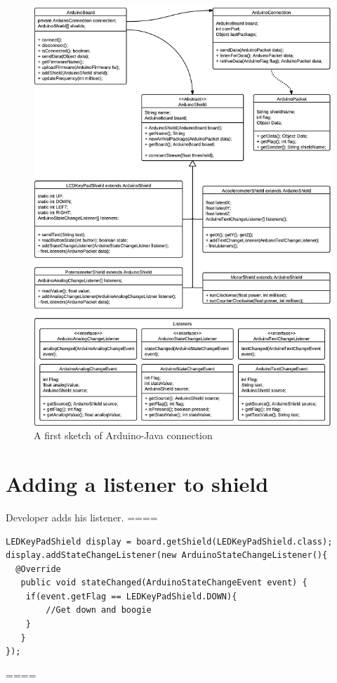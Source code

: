\clearpage

\begin{figure}[hp]
  \includegraphics{./img/architecture-arduinojava.png}
  \caption{A first sketch of Arduino-Java connection}
  \label{fig:architecture-arduinojava}
\end{figure}

\section{Adding a listener to shield}


Developer adds his listener.
====
\javacode
\begin{lstlisting}
LEDKeyPadShield display = board.getShield(LEDKeyPadShield.class);
display.addStateChangeListener(new ArduinoStateChangeListener(){
  @Override
   public void stateChanged(ArduinoStateChangeEvent event) {
    if(event.getFlag == LEDKeyPadShield.DOWN){
        //Get down and boogie
    }
   }
});
\end{lstlisting}
====

